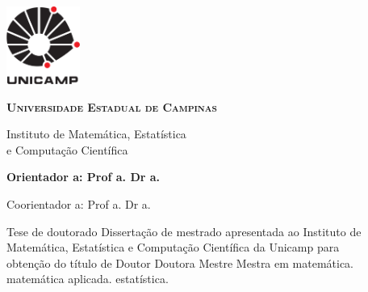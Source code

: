\thispagestyle{plain}
\includegraphics[width=.94in, height=1in,
keepaspectratio=true]{figuras/unicamp-logo}
\begin{center}
  {\large \scshape \bfseries Universidade Estadual de Campinas
  \vspace{.4cm}

  Instituto de Matemática, Estatística \\
  e Computação Científica}
\end{center}
\vspace{.4cm}
\begin{center}
  {\large \scshape \bfseries \autor}
\end{center}
\vspace{.4cm}
\begin{center}
  {\Large\textbf{\textsc{\titulo}}}
\end{center}
\vspace{.8cm}
{\bfseries
\noindent
Orientador\ifx\femaleOrientador\undefined
\else
a\fi: Prof\ifx\femaleOrientador\undefined
\else
a\fi. Dr\ifx\femaleOrientador\undefined
\else
a\fi. \orientador
\vspace{.25cm}

\ifx\coorientador\undefined
\else
\noindent
Coorientador\ifx\femaleCoorientador\undefined
\else
a\fi: Prof\ifx\femaleCoorientador\undefined
\else
a\fi. Dr\ifx\femaleCoorientador\undefined
\else
a\fi. \coorientador
\fi
}

\vspace{.45cm}
\begin{center}
  {\Large \scshape \bfseries \titulopt}
\end{center}

\vspace{.3cm}
\begin{flushright}
  \begin{minipage}[c]{.8\textwidth}
    \begin{flushright}
      \ifx\mestrado\undefined
      Tese de doutorado
      \else
      Dissertação de mestrado
      \fi
      apresentada ao Instituto de \\ Matemática,
      Estatística e Computação Científica
      da Unicamp para \\ obtenção do título de
      \ifx\mestrado\undefined
      \ifx\femaleAuthor\undefined
      Doutor
      \else
      Doutora
      \fi
      \else
      \ifx\femaleAuthor\undefined
      Mestre
      \else
      Mestra
      \fi
      \fi
      em
      \ifx\matematica\undefined
      \else
      matemática.
      \fi
      \ifx\aplicada\undefined
      \else
      matemática aplicada.
      \fi
      \ifx\estatistica\undefined
      \else
      estatística.
      \fi
    \end{flushright}
  \end{minipage}
\end{flushright}

